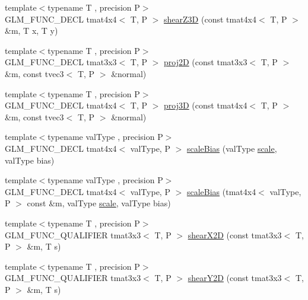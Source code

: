 \begin{DoxyCompactItemize}
\item 
{\footnotesize template$<$typename T , precision P$>$ }\\G\+L\+M\+\_\+\+F\+U\+N\+C\+\_\+\+D\+E\+C\+L tmat4x4$<$ T, P $>$ \hyperlink{group__gtx__transform2_ga5558ac64a7144685bf2eb4483a0e2f51}{shear\+Z3\+D} (const tmat4x4$<$ T, P $>$ \&m, T x, T y)
\item 
{\footnotesize template$<$typename T , precision P$>$ }\\G\+L\+M\+\_\+\+F\+U\+N\+C\+\_\+\+D\+E\+C\+L tmat3x3$<$ T, P $>$ \hyperlink{group__gtx__transform2_gacfce1085167a8bfb71a55ea14d22752f}{proj2\+D} (const tmat3x3$<$ T, P $>$ \&m, const tvec3$<$ T, P $>$ \&normal)
\item 
{\footnotesize template$<$typename T , precision P$>$ }\\G\+L\+M\+\_\+\+F\+U\+N\+C\+\_\+\+D\+E\+C\+L tmat4x4$<$ T, P $>$ \hyperlink{group__gtx__transform2_gafab0418f2503ec2133cb2de828cc482a}{proj3\+D} (const tmat4x4$<$ T, P $>$ \&m, const tvec3$<$ T, P $>$ \&normal)
\item 
{\footnotesize template$<$typename val\+Type , precision P$>$ }\\G\+L\+M\+\_\+\+F\+U\+N\+C\+\_\+\+D\+E\+C\+L tmat4x4$<$ val\+Type, P $>$ \hyperlink{group__gtx__transform2_ga2874abd228989556d610a0bff993667a}{scale\+Bias} (val\+Type \hyperlink{group__gtc__matrix__transform_ga8f062fcc07e2445500793f2803afebb0}{scale}, val\+Type bias)
\item 
{\footnotesize template$<$typename val\+Type , precision P$>$ }\\G\+L\+M\+\_\+\+F\+U\+N\+C\+\_\+\+D\+E\+C\+L tmat4x4$<$ val\+Type, P $>$ \hyperlink{group__gtx__transform2_gac1a1139e2980021422d1fc1c42dc74f2}{scale\+Bias} (tmat4x4$<$ val\+Type, P $>$ const \&m, val\+Type \hyperlink{group__gtc__matrix__transform_ga8f062fcc07e2445500793f2803afebb0}{scale}, val\+Type bias)
\item 
{\footnotesize template$<$typename T , precision P$>$ }\\G\+L\+M\+\_\+\+F\+U\+N\+C\+\_\+\+Q\+U\+A\+L\+I\+F\+I\+E\+R tmat3x3$<$ T, P $>$ \hyperlink{namespaceglm_a3cf8209f17c4b221f7d087c18c070b3b}{shear\+X2\+D} (const tmat3x3$<$ T, P $>$ \&m, T s)
\item 
{\footnotesize template$<$typename T , precision P$>$ }\\G\+L\+M\+\_\+\+F\+U\+N\+C\+\_\+\+Q\+U\+A\+L\+I\+F\+I\+E\+R tmat3x3$<$ T, P $>$ \hyperlink{namespaceglm_ac13a3617c2261d92ea67e00ba300c96a}{shear\+Y2\+D} (const tmat3x3$<$ T, P $>$ \&m, T s)
\item 

\end{DoxyCompactItemize}

